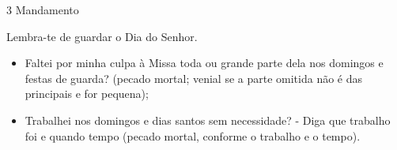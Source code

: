 \documentclass{book}
\begin{document}
\begin{center}
    3\textordmasculine{} Mandamento
\end{center}
\begin{flushleft}
    Lembra-te de guardar o Dia do Senhor.
\end{flushleft}
\begin{itemize}
    \item Faltei por minha culpa à Missa toda ou grande parte dela nos domingos e festas de guarda? (pecado mortal; venial se a parte omitida não é das principais e for pequena);
    \item Trabalhei nos domingos e dias santos sem necessidade? - Diga que trabalho foi e quando tempo (pecado mortal, conforme o trabalho e o tempo).
\end{itemize}
\end{document}

